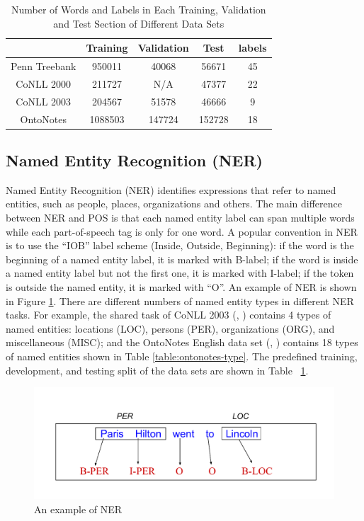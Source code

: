 \begin{table}[h]
\centering
\caption{Number of Words and Labels in Each Training, Validation and Test Section of Different Data Sets}
\label{table:my-dataset}
\begin{tabular}{|c|c|c|c|c|} \hline
      & Training  & Validation  & Test  & labels  \\ \hline
Penn Treebank   &950011 &40068 &56671 &45 \\\hline
CoNLL 2000   &211727 & N/A   &47377 &22   \\\hline
CoNLL 2003   &204567 &51578 &46666 &9     \\\hline
OntoNotes   &1088503 &147724 &152728 &18     \\\hline
\end{tabular}
\end{table}

\subsection{Named Entity Recognition (NER)}

Named Entity Recognition (NER) identifies expressions
that refer to named entities, such as people, places, organizations and others. The main difference between NER and POS is that each named entity label can span multiple words while each part-of-speech tag is only for one word. A popular convention in NER is to use the ``IOB'' label scheme (Inside, Outside, Beginning): if the word is the beginning of a named entity label, it is marked with B-label; if the word is inside a named entity label but not the first one, it is marked with I-label; if the token is outside the named entity, it is marked with ``O''. An example of NER is shown in Figure \ref{fig:ner-ex}. There are different numbers of named entity types in different NER tasks. For example, the shared task of CoNLL 2003 (\citeauthor{tjong2003introduction}, \citeyear{tjong2003introduction}) contains 4 types of named entities: locations (LOC), persons (PER), organizations (ORG), and miscellaneous (MISC); and the OntoNotes English data set (\citeauthor{hovy2006ontonotes}, \citeyear{hovy2006ontonotes}) contains 18 types of named entities shown in Table \ref{table:ontonotes-type}. The predefined training, development, and testing split of the data sets are shown in Table ~\ref{table:my-dataset}.
\begin{figure}[h]
  \centering
  \includegraphics[scale=0.6]{nerex.pdf}
 \caption{An example of NER}
  \label{fig:ner-ex}
\end{figure}

